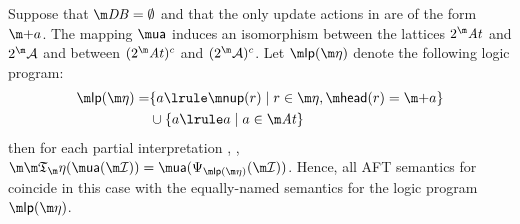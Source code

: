 \begin{proposition}\label{prop:lplink}
  Suppose that $\db=\emptyset$ and that the only update actions in \aics are of the form $\add a$.
  The mapping $\actof$ induces an isomorphism between the lattices $2^\atoms$ and $2^\acts$ and between $(2^\atoms)^c$ and $(2^\acts)^c$. 
  Let $\lpop(\aics)$ denote the following logic program:  
 \begin{align*}
  \lpop(\aics)=& \{a \lrule \nup(r)\mid r\in \aics, \head(r)= \add a\}\\
  &\cup \{a \lrule a\mid a \in \atoms\}
 \end{align*}
 then for each partial interpretation \pstruct, , $\Ap(\actof(\pstruct)) = \actof(\Psi_{\lpop(\aics)}(\pstruct))$. 
Hence, all AFT semantics for \fulldb coincide in this case with the equally-named semantics for the logic program $\lpop(\aics)$. 
\end{proposition}
